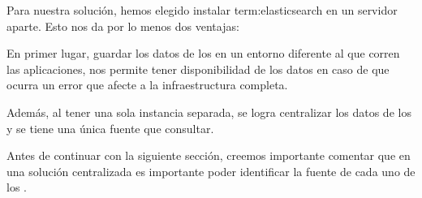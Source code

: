 Para nuestra solución, hemos elegido instalar \gls{term:elasticsearch} en un
servidor aparte. Esto nos da por lo menos dos ventajas:

En primer lugar, guardar los datos de los  en un entorno diferente al
que corren las aplicaciones, nos permite tener disponibilidad de los datos en
caso de que ocurra un error que afecte a la infraestructura completa.

Además, al tener una sola instancia separada, se logra centralizar los datos de
los  y se tiene una única fuente que consultar.

Antes de continuar con la siguiente sección, creemos importante comentar que en
una solución centralizada es importante poder identificar la fuente de cada uno
de los .
